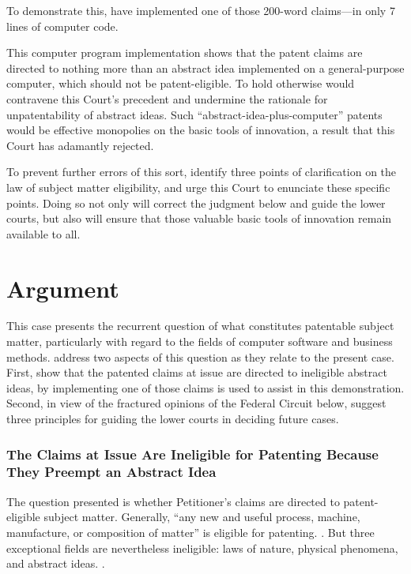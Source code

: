 \documentclass{scotus}
\begin{document}
To demonstrate this, \amici have implemented one of those 200-word
claims---in only 7 lines of computer code.

This computer program implementation shows that the patent
claims are directed to nothing more than an abstract idea implemented on a
general-purpose computer, which should not be patent-eligible.
%
To hold otherwise would contravene this
Court's precedent and undermine the rationale for unpatentability of
abstract ideas. Such ``abstract-idea-plus-computer'' patents would be effective
monopolies on the basic tools of innovation, a result that this
Court has adamantly rejected.

To prevent further errors of this sort, \amici identify three points of
clarification on the law of subject matter eligibility, and urge this Court to
enunciate these specific points. Doing so not
only will correct the judgment below and guide the lower courts, but also will
ensure that those valuable basic tools of innovation remain available to all.

\part{Argument}

This case presents the recurrent question of what constitutes patentable
subject matter, particularly with regard to the fields of computer software and
business methods. \Amici address two aspects of this question as they relate to
the present case. First, \amici show that the patented claims at issue are
directed to ineligible abstract ideas, by
implementing one of those claims is used to assist in this demonstration.
Second, in view of the fractured opinions of the Federal Circuit below, \amici
suggest three principles for guiding the lower courts in deciding future cases.



%
%
\section{The Claims at Issue Are Ineligible for Patenting Because They
Preempt an Abstract Idea}

The question presented is whether Petitioner's claims are directed to
patent-eligible subject matter. Generally, ``any new and
useful process, machine, manufacture, or composition of matter'' is eligible for
patenting. . But three exceptional fields
are nevertheless ineligible: laws of nature, physical phenomena, and abstract
ideas. .
\end{document}
